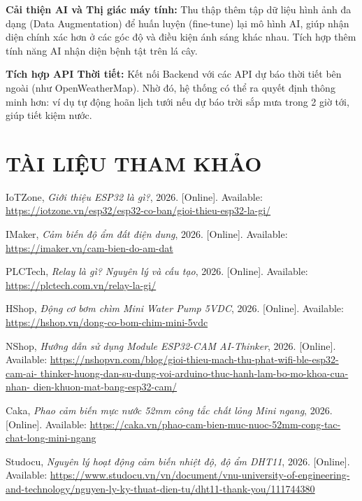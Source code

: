 \documentclass[12pt,a4paper]{report}
\begin{document}
\textbf{Cải thiện AI và Thị giác máy tính:} Thu thập thêm tập dữ liệu hình ảnh
đa dạng (Data Augmentation) để huấn luyện (fine-tune) lại mô hình AI, giúp
nhận diện chính xác hơn ở các góc độ và điều kiện ánh sáng khác nhau. Tích hợp
thêm tính năng AI nhận diện bệnh tật trên lá cây.

\textbf{Tích hợp API Thời tiết:} Kết nối Backend với các API dự báo thời tiết bên
ngoài (như OpenWeatherMap). Nhờ đó, hệ thống có thể ra quyết định thông minh
hơn: ví dụ tự động hoãn lịch tưới nếu dự báo trời sắp mưa trong 2 giờ tới,
giúp tiết kiệm nước.

\chapter*{TÀI LIỆU THAM KHẢO}

\begin{enumerate}[label={[\arabic*]}]
    \item IoTZone, \textit{Giới thiệu ESP32 là gì?}, 2026. [Online]. Available: \url{https://iotzone.vn/esp32/esp32-co-ban/gioi-thieu-esp32-la-gi/}
    
    \item IMaker, \textit{Cảm biến độ ẩm đất điện dung}, 2026. [Online]. Available: \url{https://imaker.vn/cam-bien-do-am-dat}
    
    \item PLCTech, \textit{Relay là gì? Nguyên lý và cấu tạo}, 2026. [Online]. Available: \url{https://plctech.com.vn/relay-la-gi/}
    
    \item HShop, \textit{Động cơ bơm chìm Mini Water Pump 5VDC}, 2026. [Online]. Available: \url{https://hshop.vn/dong-co-bom-chim-mini-5vdc}
    
    \item NShop, \textit{Hướng dẫn sử dụng Module ESP32-CAM AI-Thinker}, 2026. [Online]. Available: \url{https://nshopvn.com/blog/gioi-thieu-mach-thu-phat-wifi-ble-esp32-cam-ai-
    thinker-huong-dan-su-dung-voi-arduino-thuc-hanh-lam-bo-mo-khoa-cua-nhan-
    dien-khuon-mat-bang-esp32-cam/}
    
    \item Caka, \textit{Phao cảm biến mực nước 52mm công tắc chất lỏng Mini ngang}, 2026. [Online]. Available: \url{https://caka.vn/phao-cam-bien-muc-nuoc-52mm-cong-tac-chat-long-mini-ngang}
    
    \item Studocu, \textit{Nguyên lý hoạt động cảm biến nhiệt độ, độ ẩm DHT11}, 2026. [Online]. Available: \url{https://www.studocu.vn/vn/document/vnu-university-of-engineering-and-technology/nguyen-ly-ky-thuat-dien-tu/dht11-thank-you/111744380}
\end{enumerate}
\end{document}
